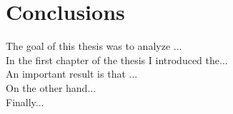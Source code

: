 \chapter*{Conclusions}

The goal of this thesis was to analyze ...
\\
In the first chapter of the thesis I introduced the...
\\
 An important result is that ...
\\
On the other hand...
\\
Finally...
